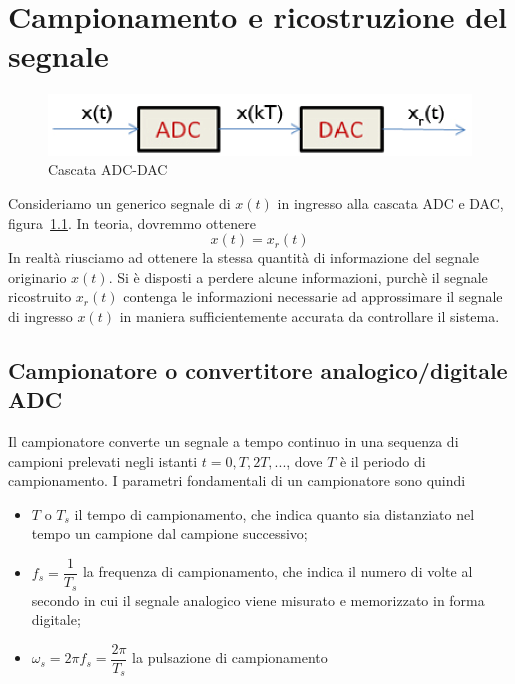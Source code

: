 \documentclass[a4paper]{report}
\begin{document}
\chapter{Campionamento e ricostruzione del segnale}
\begin{figure}[!h]
  \begin{center}
    \includegraphics[scale=0.3]{./figures/campionamentoRicostruizioneSegnale.png}
    \caption{Cascata ADC-DAC}\label{fig:campionamentoRicostruizioneSegnale}
  \end{center}
\end{figure}
Consideriamo un generico segnale di $x(t)$ in ingresso alla cascata
ADC e DAC, figura~\ref{fig:campionamentoRicostruizioneSegnale}. In
teoria, dovremmo ottenere
\[
x(t) = x_r(t)
\]
In realt\`a riusciamo ad ottenere la stessa quantit\`a di informazione
del segnale originario $x(t)$. Si \`e disposti a perdere alcune
informazioni, purch\`e il segnale ricostruito $x_r(t)$ contenga le
informazioni necessarie ad approssimare il segnale di ingresso $x(t)$
in maniera sufficientemente accurata da controllare il sistema.

\section{Campionatore o convertitore analogico/digitale ADC}
Il campionatore converte un segnale a tempo continuo in una sequenza
di campioni prelevati negli istanti $t = 0, T, 2T, ...$, dove $T$ \`e
il periodo di campionamento. I parametri fondamentali di un
campionatore sono quindi
\begin{itemize}
\item $T$ o $T_s$ il tempo di campionamento, che indica quanto sia
  distanziato nel tempo un campione dal campione successivo;
\item $f_s = \dfrac{1}{T_s}$ la frequenza di campionamento, che indica il numero di
  volte al secondo in cui il segnale analogico viene misurato e
  memorizzato in forma digitale;
\item $\omega_s = 2 \pi f_s = \dfrac{2 \pi}{T_s}$ la pulsazione di campionamento
\end{itemize}
\end{document}
